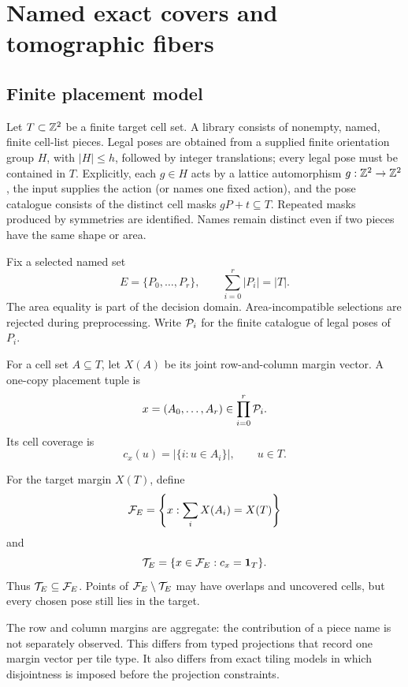 \section{Named exact covers and tomographic fibers}\label{sec:model}

\subsection{Finite placement model}

Let \(T\subset\mathbb Z^2\) be a finite target cell set.  A library consists of
nonempty, named, finite cell-list pieces.  Legal poses are obtained from a
supplied finite orientation group \(H\), with \(|H|\leq h\), followed by
integer translations; every legal pose must be contained in \(T\).
Explicitly, each \(g\in H\) acts by a lattice automorphism
\(g:\mathbb Z^2\to\mathbb Z^2\), the input supplies the action (or names one fixed
action), and the pose catalogue consists of the distinct cell masks
\(gP+t\subseteq T\).  Repeated masks produced by symmetries are identified.
Names remain distinct even if two pieces have the same shape or area.

Fix a selected named set
\[
  E=\{P_0,\ldots,P_r\},\qquad \sum_{i=0}^r |P_i|=|T|.
\]
The area equality is part of the decision domain.  Area-incompatible
selections are rejected during preprocessing.  Write \(\mathcal P_i\) for the
finite catalogue of legal poses of \(P_i\).

For a cell set \(A\subseteq T\), let \(X(A)\) be its joint row-and-column
margin vector.  A one-copy placement tuple is
\[
  x=(A_0,\ldots,A_r)\in\prod_{i=0}^r\mathcal P_i.
\]
Its cell coverage is
\[
  c_x(u)=|\{i:u\in A_i\}|,\qquad u\in T.
\]

\begin{definition}\label{def:fiber}
For the target margin \(X(T)\), define
\[
  \mathcal F_E=\left\{x:\sum_i X(A_i)=X(T)\right\}
\]
and
\[
  \mathcal T_E=\{x\in\mathcal F_E:c_x=\mathbf 1_T\}.
\]
Thus \(\mathcal T_E\subseteq\mathcal F_E\).  Points of \(\mathcal F_E\setminus\mathcal T_E\)
may have overlaps and uncovered cells, but every chosen pose still lies in
the target.
\end{definition}

The row and column margins are aggregate: the contribution of a piece name
is not separately observed.  This differs from typed projections that record
one margin vector per tile type.  It also differs from exact tiling models in
which disjointness is imposed before the projection constraints.

